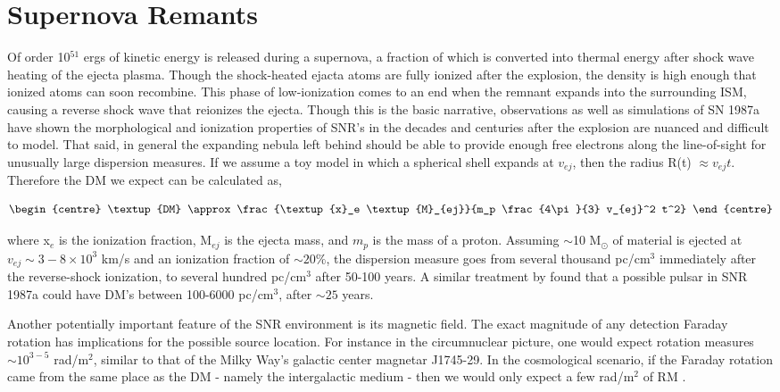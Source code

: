 \documentclass[useAMS,usenatbib]{mn2e}
\begin{document}

\section{Supernova Remants}
Of order 10$^{51}$ ergs of kinetic energy is released during a supernova, a 
fraction of which is converted into thermal 
energy after shock wave heating of the 
ejecta plasma. Though the shock-heated ejacta atoms 
are fully ionized after the explosion, the density is high enough that
ionized atoms can soon recombine.
This phase of low-ionization comes to an end when the remnant expands 
into the surrounding ISM, causing a reverse shock wave that reionizes the ejecta.
Though this is the basic narrative, observations \citep{2014ApJ...796...82Z} 
as well as simulations \citep{2014ApJ...794..174P}
of SN 1987a have shown the morphological and ionization properties of SNR's
in the decades and centuries after the explosion are nuanced and 
difficult to model.
That said, in general the expanding nebula left behind 
should be able to provide enough free electrons
along the line-of-sight for unusually large dispersion measures. If we 
assume a toy model in which a spherical shell expands at $v_{ej}$, 
then the radius R(t) $\approx v_{ej} t$. Therefore the DM we expect can be 
calculated as,

\begin{equation}
\begin{centre}
\textup{DM} \approx  \frac{\textup{x}_e \textup{M}_{ej}}{m_p \frac{4\pi}{3} v_{ej}^2 t^2}
\end{centre}
\end{equation}

\noindent where x$_e$ is the ionization fraction, 
M$_{ej}$ is the ejecta mass, and $m_p$ 
is the mass of a proton. Assuming $\sim$10 M$_{\odot}$ of material 
is ejected at $v_{ej}\sim 3-8\times10^3$ km/s and an ionization fraction of 
$\sim 20\% $, the dispersion measure goes from several 
thousand pc/cm$^3$ immediately
after the reverse-shock ionization, to several hundred pc/cm$^3$ after 50-100 years.
A similar treatment by \cite{2014ApJ...796...82Z} found that a possible pulsar in SNR 
1987a could have DM's between 100-6000 pc/cm$^3$, after $\sim 25$ years.

Another potentially important feature of the SNR environment is its magnetic
field. 
The exact magnitude of any detection Faraday rotation has implications for the possible source location. For
instance in the circumnuclear picture, one would expect rotation measures 
$\sim10^{3-5}$ rad/m$^2$, similar to that of the Milky Way's
galactic center magnetar J1745-29. In the cosmological scenario, if the Faraday 
rotation
came from the same place as the DM - namely the intergalactic medium -
then we would only expect a few rad/m$^2$ of RM \cite{2015A&A...575A.118O}. 
\end{document}
